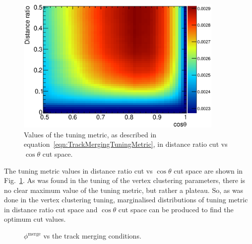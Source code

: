 \begin{figure}[!b]
  \centering
  \includegraphics[width=10cm]{images/selection/vertex_recon/TrackMergingTuningFOM}
  \caption{Values of the tuning metric, as described in equation~\ref{eqn:TrackMergingTuningMetric}, in distance ratio cut vs $\cos\theta$ cut space.}
  \label{fig:TrackMergingTuningFOM}
\end{figure}
The tuning metric values in distance ratio cut vs $\cos\theta$ cut space are shown in Fig.~\ref{fig:TrackMergingTuningFOM}.  As was found in the tuning of the vertex clustering parameters, there is no clear maximum value of the tuning metric, but rather a plateau.  So, as was done in the vertex clustering tuning, marginalised distributions of tuning metric in distance ratio cut space and $\cos\theta$ cut space can be produced to find the optimum cut values. 
\begin{figure}
  \centering
  \caption{$\phi^{\textrm{merge}}$ vs the track merging conditions.}
  \label{fig:TrackMergingMarginalizedDistributions}
\end{figure}

